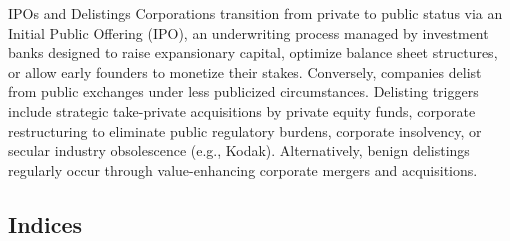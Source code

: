 \documentclass[10pt]{article}
\begin{document}
    \begin{core}{IPOs and Delistings}
      Corporations transition from private to public status via an Initial Public Offering (IPO), an underwriting process managed by investment banks designed to raise expansionary capital, optimize balance sheet structures, or allow early founders to monetize their stakes. Conversely, companies delist from public exchanges under less publicized circumstances. Delisting triggers include strategic take-private acquisitions by private equity funds, corporate restructuring to eliminate public regulatory burdens, corporate insolvency, or secular industry obsolescence (e.g., Kodak). Alternatively, benign delistings regularly occur through value-enhancing corporate mergers and acquisitions.
    \end{core}

  \subsection{Indices}
\end{document}

